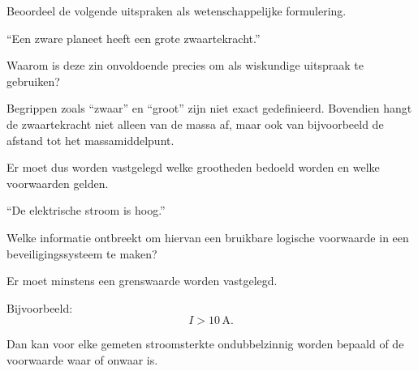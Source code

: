 \documentclass{ximera}
\begin{document}
\begin{oefening}{\oefU}

Beoordeel de volgende uitspraken als wetenschappelijke formulering.

\begin{question}
``Een zware planeet heeft een grote zwaartekracht.''

Waarom is deze zin onvoldoende precies om als wiskundige uitspraak te
gebruiken?

\begin{oplossing}
Begrippen zoals ``zwaar'' en ``groot'' zijn niet exact gedefinieerd.
Bovendien hangt de zwaartekracht niet alleen van de massa af, maar ook
van bijvoorbeeld de afstand tot het massamiddelpunt.

Er moet dus worden vastgelegd welke grootheden bedoeld worden en welke
voorwaarden gelden.
\end{oplossing}
\end{question}


\begin{question}
``De elektrische stroom is hoog.''

Welke informatie ontbreekt om hiervan een bruikbare logische
voorwaarde in een beveiligingssysteem te maken?

\begin{oplossing}
Er moet minstens een grenswaarde worden vastgelegd.

Bijvoorbeeld:
\[
I>10\,\mathrm{A}.
\]

Dan kan voor elke gemeten stroomsterkte ondubbelzinnig worden bepaald
of de voorwaarde waar of onwaar is.
\end{oplossing}
\end{question}

\end{oefening}



\end{document}
